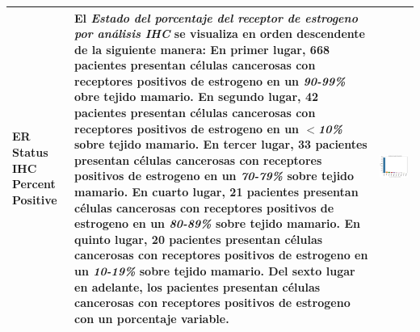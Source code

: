 \begin{table}[!htb]
\begin{threeparttable}
\begin{tabular}{p{2.5cm} p{7cm} p{6.5cm}}
			ER Status IHC Percent Positive
			&El \textit{Estado del porcentaje del receptor de estrogeno por análisis IHC} se visualiza en orden descendente de la siguiente manera: En primer lugar, 668 pacientes presentan células cancerosas con receptores positivos de estrogeno en un \textit{90-99\%} obre tejido mamario. En segundo lugar, 42 pacientes presentan células cancerosas con receptores positivos de estrogeno en un $<$\textit{10\%} sobre tejido mamario. En tercer lugar, 33 pacientes presentan células cancerosas con receptores positivos de estrogeno en un \textit{70-79\%} sobre tejido mamario. En cuarto lugar, 21 pacientes presentan células cancerosas con receptores positivos de estrogeno en un \textit{80-89\%} sobre tejido mamario. En quinto lugar, 20 pacientes presentan células cancerosas con receptores positivos de estrogeno en un \textit{10-19\%} sobre tejido mamario. Del sexto lugar en adelante, los pacientes presentan células cancerosas con receptores positivos de estrogeno con un porcentaje variable.
			& \begin{center}\includegraphics[width=1\linewidth]{NOTEBOOK/IMAGENES_DESCRIPTIVAS/14_er_status_ihc_percent_positive}\end{center}
			\\ \hline
			

\end{tabular}
\end{threeparttable}
\end{table}
